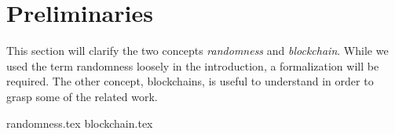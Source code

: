 \section{Preliminaries}\label{sec:preliminaries}
This section will clarify the two concepts \emph{randomness} and \emph{blockchain}.
While we used the term randomness loosely in the introduction, a formalization will be required. The other concept, blockchains, is useful to understand in order to grasp some of the related work.

{randomness.tex}
{blockchain.tex}
